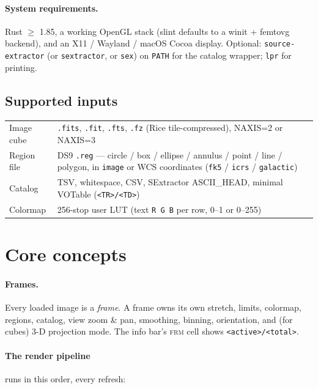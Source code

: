 \documentclass[11pt,a4paper]{article}
\begin{document}
\paragraph{System requirements.} Rust $\geq$ 1.85, a working OpenGL stack
(slint defaults to a winit + femtovg backend), and an X11 / Wayland / macOS
Cocoa display. Optional: \texttt{source-extractor} (or \texttt{sextractor},
or \texttt{sex}) on \texttt{PATH} for the catalog wrapper; \texttt{lpr} for
printing.

\subsection{Supported inputs}

\begin{tabular}{>{\sffamily}lp{}}
\toprule
Image cube  & \texttt{.fits}, \texttt{.fit}, \texttt{.fts},
              \texttt{.fz} (Rice tile-compressed), NAXIS=2 or NAXIS=3 \\
Region file & DS9 \texttt{.reg} --- circle / box / ellipse / annulus / point /
              line / polygon, in \texttt{image} or WCS coordinates
              (\texttt{fk5} / \texttt{icrs} / \texttt{galactic}) \\
Catalog     & TSV, whitespace, CSV, SExtractor ASCII\_HEAD,
              minimal VOTable (\texttt{<TR>/<TD>}) \\
Colormap    & 256-stop user LUT (text \texttt{R G B} per row, 0--1 or 0--255) \\
\bottomrule
\end{tabular}

\section{Core concepts}

\paragraph{Frames.} Every loaded image is a \emph{frame}. A frame owns its
own stretch, limits, colormap, regions, catalog, view zoom \& pan,
smoothing, binning, orientation, and (for cubes) 3-D projection mode. The
info bar's \textsc{frm} cell shows \texttt{<active>/<total>}.

\paragraph{The render pipeline} runs in this order, every refresh:
\end{document}
